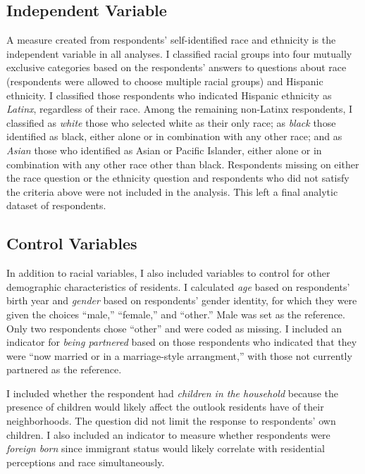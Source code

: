 \documentclass{baderart}
\newcommand{\TK}[1][]{\strong{TK #1}}
\begin{document}
\subsection{Independent Variable}\label{independent-variable}

A measure created from respondents' self-identified race and ethnicity is the independent variable in all analyses. I classified racial groups into four mutually exclusive categories based on the respondents' answers to questions about race (respondents were allowed to choose multiple racial groups) and Hispanic ethnicity. 
I classified those respondents who indicated Hispanic ethnicity as \emph{Latinx}, regardless of their race. Among the remaining non-Latinx respondents, I classified as \emph{white} those who selected white as their only race; as \emph{black} those identified as black, either alone or in combination with any other race; and as \emph{Asian} those who identified as Asian or Pacific Islander, either alone or in combination with any other race other than black. Respondents missing on either the race question or the ethnicity question and respondents who did not satisfy the criteria above were not included in the analysis. This left a final analytic dataset of \TK[N] respondents.

\subsection{Control Variables}\label{control-variables}

In addition to racial variables, I also included variables to control for other demographic characteristics of residents. I calculated \emph{age} based on respondents' birth year and \emph{gender} based on respondents' gender identity, for which they were given the choices ``male,'' ``female,'' and ``other.'' Male was set as the reference. Only two respondents chose ``other'' and were coded as missing. I included an indicator for \emph{being partnered} based on those respondents who indicated that they were ``now married or in a marriage-style arrangment,'' with those not currently partnered as the reference.

I included whether the respondent had \emph{children in the household} because the presence of children would likely affect the outlook residents have of their neighborhoods. The question did not limit the response to respondents' own children. I also included an indicator to measure whether respondents were \emph{foreign born} since immigrant status would likely correlate with residential perceptions and race simultaneously.
\end{document}
